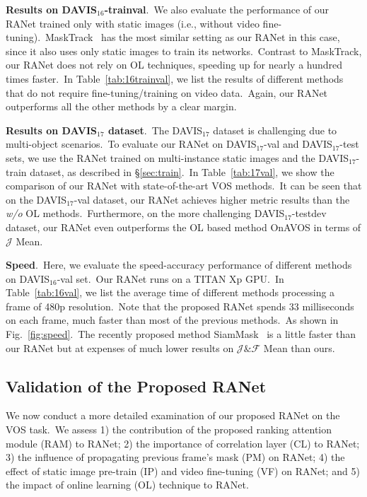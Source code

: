 \documentclass[10pt,twocolumn,letterpaper]{article}
\begin{document}
\noindent
\textbf{Results on DAVIS$_{16}$-trainval}.\
We also evaluate the performance of our RANet trained only with static images (i.e., without video fine-tuning).\ MaskTrack~\cite{masktrack} has the most similar setting as our RANet in this case, since it also uses only static images to train its networks.\ Contrast to MaskTrack, our RANet does not rely on OL techniques, speeding up for nearly a hundred times faster.\ In Table~\ref{tab:16trainval}, we list the results of different methods that do not require fine-tuning/training on video data.\ Again, our RANet outperforms all the other methods by a clear margin.






\noindent
\textbf{Results on DAVIS$_{17}$ dataset}.\ The DAVIS$_{17}$ dataset is challenging due to multi-object scenarios.\ To evaluate our RANet on DAVIS$_{17}$-val and DAVIS$_{17}$-test sets, we use the RANet trained on multi-instance static images and the DAVIS$_{17}$-train dataset, as described in \S\ref{sec:train}.\ In Table~\ref{tab:17val}, we show the comparison of our RANet with state-of-the-art VOS methods.\ It can be seen that on the DAVIS$_{17}$-val dataset, our RANet achieves higher metric results than the \emph{w/o} OL methods.\ Furthermore, on the more challenging DAVIS$_{17}$-testdev dataset, our RANet even outperforms the OL based method OnAVOS in terms of $\mathcal{J}$ Mean.




\noindent
\textbf{Speed}.\
Here, we evaluate the speed-accuracy performance of different methods on DAVIS$_{16}$-val set.\ Our RANet runs on a TITAN Xp GPU.\ In Table~\ref{tab:16val}, we list the average time of different methods processing a frame of 480p resolution.\ Note that the proposed RANet spends 33 milliseconds on each frame, much faster than most of the previous methods.\ As shown in Fig.~\ref{fig:speed}.\ The recently proposed method SiamMask~\cite{siammask} is a little faster than our RANet but at expenses of much lower results on $\mathcal{J}\&\mathcal{F}$ Mean than ours.\ 






\subsection{Validation of the Proposed RANet}
\label{sec:ablation}

We now conduct a more detailed examination of our proposed RANet on the VOS task.\ We assess 1) the contribution of the proposed ranking attention module (RAM) to RANet; 2) the importance of correlation layer (CL) to RANet; 3) the influence of propagating previous frame's mask (PM) on RANet; 4) the effect of static image pre-train (IP) and video fine-tuning (VF) on RANet; and 5) the impact of online learning (OL) technique to RANet.
\end{document}

